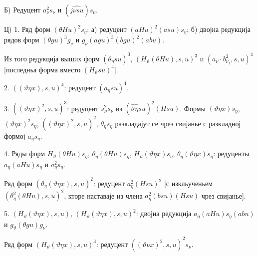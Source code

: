 ﻿\documentclass[11pt]{article}
\begin{document}
Б) Редуцент $a_{\nu}^2s_{\nu}$ и $(\widehat{j\nu su})s_{\nu}$.

Ц) 1. Ряд форм $(\theta Hu)^2s_\eta$: а) редуцент $(aHu)^2(asu)s_\eta$; б) двојна редукција рядов форм $(\theta gu)^3g_{\nu}$ и $g_{\nu}(agu)^3(bgu)^2(abu)$.

Из того редукција выших форм $(\theta_\eta su)^3$, $(H_\vartheta(\theta Hu),s,u)^3$ и $(a_{\nu}\cdot b_{\nu_1}^2,s,u)^4$ [последньа форма вместо $(H_\vartheta su)^4$].

2. $((\vartheta\eta x),s,u)^4$: редуцент $(a_\eta su)^4$.

3. $((\vartheta\eta x)^2,s,u)^3$: редуцент $s_\vartheta^2s_{\nu}$ из $(\widehat{\vartheta\eta}su)^2(Hsu)$. Формы $(\vartheta\eta x)s_\eta$, $(\vartheta\eta x)^2s_\eta$, $((\vartheta\eta x)^2,s,u)^2$, $\theta_\eta s_\eta$ разкладајут се чрез свијанье с разкладној формој $a_\eta s_\eta$.

4. Ряды форм $H_\vartheta(\theta Hu)s_\eta$, $\theta_\eta(\theta Hu)s_\eta$, $H_\vartheta(\vartheta\eta x)s_\eta$, $\theta_\eta(\vartheta\eta x)s_\eta$: редуценты $a_\eta(aHu)s_\eta$ и $a_\eta^2s_\eta$.

Ряд форм $(\theta_\eta(\vartheta\eta x),s,u)^2$: редуцент $a_\eta^2(Hsu)^2$ [с изкльученьем $(\theta_\eta^2(\theta Hu),s,u)^2$, кторе наставаје из члена $a_\eta^2(bsu)(Hsu)$ чрез свијанье].

5. $(H_\vartheta(\vartheta\eta x),s,u)$, $(H_\vartheta(\vartheta\eta x),s,u)^2$: двојна редукција $a_\eta(aHu)s_\eta(abu)$ и $g_\vartheta(\theta gu)g_{\nu}$.

Ряд форм $(H_\vartheta(\vartheta\eta x),s,u)^3$: редуцент $((\vartheta\nu x)^2,s,u)^2s_{\nu}$.
\end{document}
